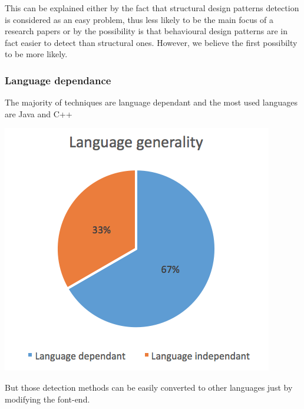 \documentclass[letterpaper, 10 pt, conference]{ieeeconf}  %
\begin{document}
This can be explained either by the fact that structural design patterns
detection is considered as an easy problem, thus less likely to be the main
focus of a research papers or by the possibility is that behavioural design
patterns are in fact easier to detect than structural ones.
However, we believe the first possibilty to be more likely.



\subsubsection{Language dependance}
The majority of techniques are language dependant and the most used 
languages are Java and C++

\begin{center}
\includegraphics[scale=0.75]{language_generality.png}
\end{center}

But those detection methods can be easily converted to other languages
just by modifying the font-end.
\end{document}
